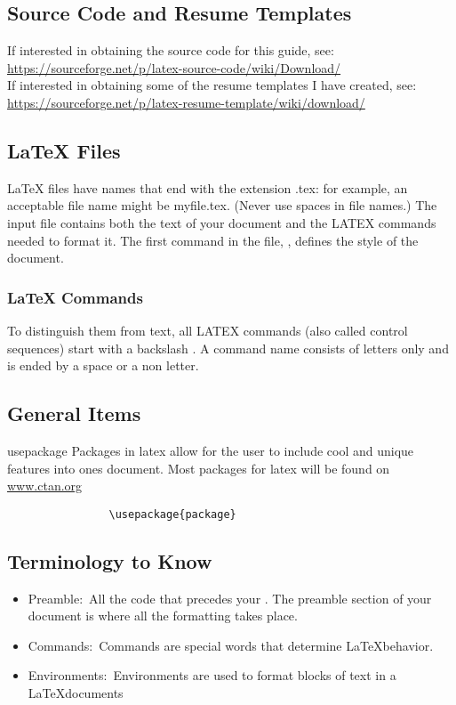 \documentclass[12pt,hidelinks]{article}
\begin{document}
	\subsection{Source Code and Resume Templates}
			If interested in obtaining the source code for this guide, see:\\
			\url{https://sourceforge.net/p/latex-source-code/wiki/Download/}\\
			If interested in obtaining some of the resume templates I have created, see:\\ \url{https://sourceforge.net/p/latex-resume-template/wiki/download/}
	\subsection{LaTeX Files}
			LaTeX files have names that end with the extension .tex: for example, an acceptable file name might be myfile.tex. (Never use spaces in file names.) The input file contains both the text of your document and the LATEX commands needed to format it. The first command in the file, , defines the style of the document.
	\subsubsection{LaTeX Commands}
			To distinguish them from text, all LATEX commands (also called control sequences) start with a backslash \cs. A command name consists of letters only and is ended by a space or a non letter.
	\subsection{General Items}
		\begin{docCommand}{usepackage}{}
			Packages in latex allow for the user to include cool and unique features into ones document. Most packages for latex will be found on \url{www.ctan.org}
			\begin{verbatim}
				\usepackage{package}
			\end{verbatim}
		\end{docCommand}
	\subsection{Terminology to Know}
			\begin{itemize}
				\item Preamble:\, All the code that precedes your . The preamble section of your document is where all the formatting takes place. 
				\item Commands:\, Commands are special words that determine \LaTeX behavior.
				\item Environments:\, Environments are used to format blocks of text in a \LaTeX documents
			\end{itemize}
\end{document}

